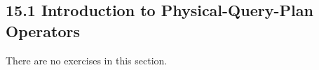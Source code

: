 \documentclass[../../main.tex]{subfiles}
\begin{document}
\subsection{15.1 Introduction to Physical-Query-Plan Operators}

There are no exercises in this section.
\end{document}
